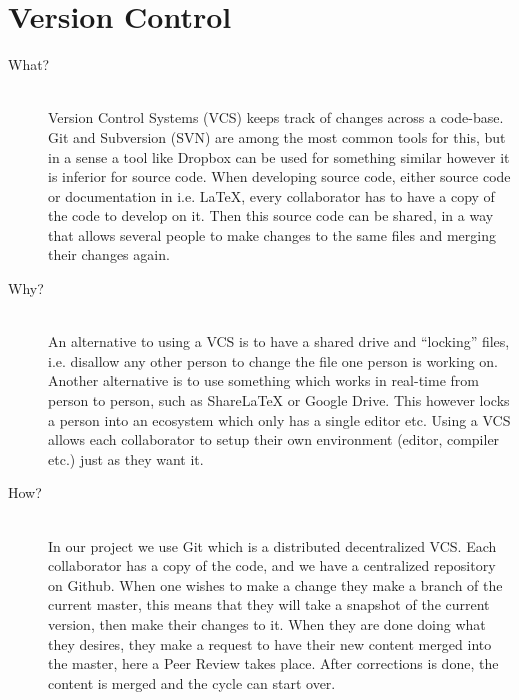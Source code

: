 \section*{Version Control}
\label{sec:versioncontrol}
\begin{description}
    \item[What?]\hfill\\
    Version Control Systems (VCS) keeps track of changes across a code-base. 
    Git and Subversion (SVN) are among the most common tools for this, but in a sense a tool like Dropbox can be used for something similar however it is inferior for source code.
    When developing source code, either source code or documentation in i.e. LaTeX, every collaborator has to have a copy of the code to develop on it. 
    Then this source code can be shared, in a way that allows several people to make changes to the same files and merging their changes again. 
    \item[Why?]\hfill\\ 
    An alternative to using a VCS is to have a shared drive and ``locking'' files, i.e. disallow any other person to change the file one person is working on. 
    Another alternative is to use something which works in real-time from person to person, such as ShareLaTeX or Google Drive. 
    This however locks a person into an ecosystem which only has a single editor etc. 
    Using a VCS allows each collaborator to setup their own environment (editor, compiler etc.) just as they want it. 
    \item[How?]\hfill\\
    In our project we use Git which is a distributed decentralized VCS. 
    Each collaborator has a copy of the code, and we have a centralized repository on Github. 
    When one wishes to make a change they make a branch of the current master, this means that they will take a snapshot of the current version, then make their changes to it.
    When they are done doing what they desires, they make a request to have their new content merged into the master, here a Peer Review takes place. 
    After corrections is done, the content is merged and the cycle can start over. 
\end{description}

